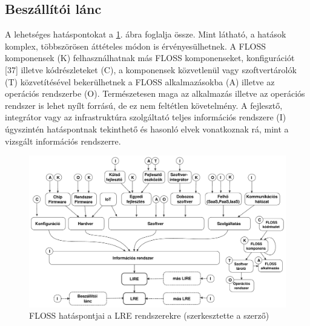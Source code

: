 \documentclass[12pt,magyar,a4paper,oneside]{scrreprt}
\begin{document}
\hypertarget{beszuxe1lluxedtuxf3i-luxe1nc}{%
\subsection{Beszállítói lánc}\label{beszuxe1lluxedtuxf3i-luxe1nc}}

A lehetséges hatáspontokat a \ref{fig:FLOSSHatuxe1s}. ábra foglalja
össze. Mint látható, a hatások komplex, többszörösen áttételes módon is
érvényesülhetnek. A FLOSS komponensek (K) felhasználhatnak más FLOSS
komponenseket, konfigurációt {[}37{]} illetve kódrészleteket (C), a
komponensek közvetlenül vagy szoftvertárolók (T) közvetítésével
bekerülhetnek a FLOSS alkalmazásokba (A) illetve az operációs rendszerbe
(O). Természetesen maga az alkalmazás illetve az operációs rendszer is
lehet nyílt forrású, de ez nem feltétlen követelmény. A fejlesztő,
integrátor vagy az infrastruktúra szolgáltató teljes információs
rendszere (I) úgyszintén hatáspontnak tekinthető és hasonló elvek
vonatkoznak rá, mint a vizsgált információs rendszerre.

\begin{figure}
\hypertarget{fig:FLOSSHatuxe1s}{%
\centering
\includegraphics{ábrák/FLOSS_hatáspontjai.pdf}
\caption{FLOSS hatáspontjai a LRE rendszerekre (szerkesztette a
szerző)}\label{fig:FLOSSHatuxe1s}
}
\end{figure}
\end{document}
